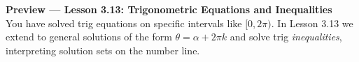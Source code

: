 \documentclass[10pt]{article}
\begin{document}
\vspace{0.08in}

\begin{tcolorbox}[colback=navylight, colframe=navy, arc=2mm,
    left=3mm, right=3mm, top=2mm, bottom=2mm]
\small\textbf{Preview --- Lesson 3.13: Trigonometric Equations and Inequalities}\\
You have solved trig equations on specific intervals like $[0, 2\pi)$.
In Lesson 3.13 we extend to general solutions of the form $\theta = \alpha + 2\pi k$
and solve trig \emph{inequalities}, interpreting solution sets on the number line.
\end{tcolorbox}
\end{document}
